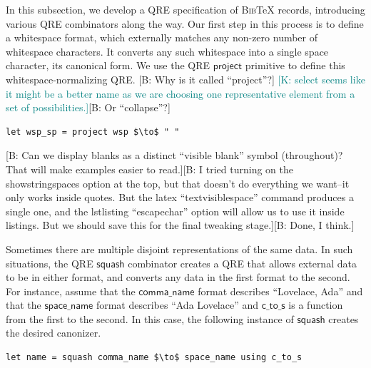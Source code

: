 \documentclass[acmsmall,review,anonymous]{acmart}
\newcommand{\FINISH}[3]{\ifdraft\textcolor{#1}{[#2: #3]}\fi}
\newcommand{\bcp}[1]{\FINISH{dkred}{B}{#1}}
\newcommand{\ksf}[1]{\FINISH{teal}{K}{#1}}
\newcommand{\codefont}[1]{\ensuremath{\mathsf{#1}}}
\newcommand{\kw}[1]{\textcolor{dkred}{\ensuremath{\mathsf{#1}}}}
\newcommand{\bibtex}{\textsc{Bib}\TeX{}}
\begin{document}
In this subsection, we develop a QRE specification of \bibtex{}
records, introducing various QRE combinators along the way. 
Our first step in this process is to define a
whitespace format, which externally matches any non-zero number of whitespace
characters. It converts any such whitespace into a single space
character, its canonical form. 
We use the QRE \kw{project} primitive to define this
whitespace-normalizing QRE. \bcp{Why is it called
``project''?} \ksf{select seems like it might be a better name as we
are choosing one representative element from a set of possibilities.}\bcp{Or
``collapse''?}

\begin{lstlisting}
let wsp_sp = project wsp $\to$ " "
\end{lstlisting}
\iflastminute
\bcp{Can we display blanks as a distinct ``visible blank'' symbol
(throughout)?  That will make examples easier to read.}\bcp{I tried turning
on the showstringspaces option at the top, but that doesn't do everything we
want--it only works inside quotes.  But the latex ``textvisiblespace'' command
produces a single one, and the lstlisting ``escapechar'' option will allow
us to use it inside listings.  But we should save this for the final
tweaking stage.}\bcp{Done, I think.}
\fi

Sometimes there are multiple disjoint representations of the same data.
In such situations, the QRE \kw{squash} combinator creates a QRE that
allows external data to be in either format, and converts any
data in the first format to the second.
For instance, assume that
the \codefont{comma\_name} format describes ``Lovelace, Ada''
and that the \codefont{space\_name} format describes ``Ada Lovelace''
and \codefont{c\_to\_s} is a function from the first to the second.  In this
case, the following instance of \kw{squash} creates the desired canonizer.


\begin{lstlisting}
let name = squash comma_name $\to$ space_name using c_to_s
\end{lstlisting}
\end{document}
